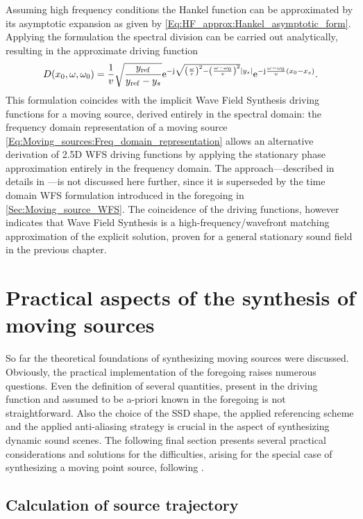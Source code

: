 Assuming high frequency conditions the Hankel function can be approximated by its asymptotic expansion as given by \eqref{Eq:HF_approx:Hankel_asymptotic_form}.
Applying the formulation the spectral division can be carried out analytically, resulting in the approximate driving function
\begin{equation}
D(x_0,\omega,\omega_0) = 
\frac{1}{v}
\sqrt{\frac{y_{\mathrm{ref}}}{y_{\mathrm{ref}}- y_s}}
\mathrm{e}^{-\mathrm{j} \sqrt{ \left(\frac{\omega}{c}\right)^2 - \left( \frac{\omega-\omega_0}{v} \right)^2}|y_s|}
\mathrm{e}^{-\mathrm{j} \frac{\omega-\omega_0}{v} (x_0 - x_s)}.
\end{equation}
This formulation coincides with the implicit Wave Field Synthesis driving functions for a moving source, derived entirely in the spectral domain: 
the frequency domain representation of a moving source \eqref{Eq:Moving_sources:Freq_domain_representation} allows an alternative derivation of 2.5D WFS driving functions by applying the stationary phase approximation entirely in the frequency domain.
The approach---described in details in \cite{firtha2015sound}---is not discussed here further, since it is superseded by the time domain WFS formulation introduced in the foregoing in \ref{Sec:Moving_source_WFS}.
The coincidence of the driving functions, however indicates that Wave Field Synthesis is a high-frequency/wavefront matching approximation of the explicit solution, proven for a general stationary sound field in the previous chapter.

\section{Practical aspects of the synthesis of moving sources}

So far the theoretical foundations of synthesizing moving sources were discussed.
Obviously, the practical implementation of the foregoing raises numerous questions.
Even the definition of several quantities, present in the driving function and assumed to be a-priori known in the foregoing is not straightforward.
Also the choice of the SSD shape, the applied referencing scheme and the applied anti-aliasing strategy is crucial in the aspect of synthesizing dynamic sound scenes.
The following final section presents several practical considerations and solutions for the difficulties, arising for the special case of synthesizing a moving point source, following \cite{Firtha2018_daga_moving_source}.

\subsection{Calculation of source trajectory}

